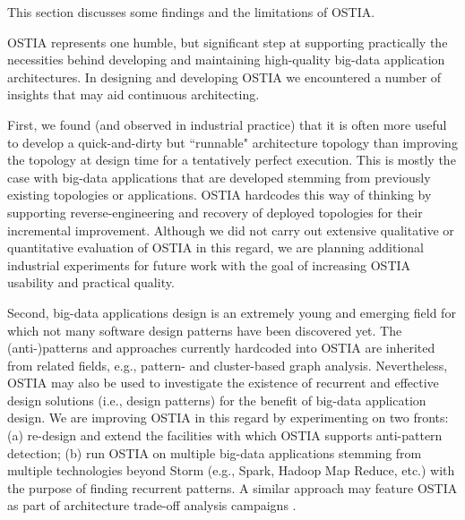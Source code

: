 This section discusses some findings and the limitations of OSTIA.

OSTIA represents one humble, but significant step at supporting practically the necessities behind developing and maintaining high-quality big-data application architectures. In designing and developing OSTIA we encountered a number of insights that may aid continuous architecting.

First, we found (and observed in industrial practice) that it is often more useful to develop a quick-and-dirty but ``runnable" architecture topology than improving the topology at design time for a tentatively perfect execution. This is mostly the case with big-data applications that are developed stemming from previously existing topologies or applications. OSTIA hardcodes this way of thinking by supporting reverse-engineering and recovery of deployed topologies for their incremental improvement. Although we did not carry out extensive qualitative or quantitative evaluation of OSTIA in this regard, we are planning additional industrial experiments for future work with the goal of increasing OSTIA usability and practical quality.

Second, big-data applications design is an extremely young and emerging field for which not many software design patterns have been discovered yet. The (anti-)patterns and approaches currently hardcoded into OSTIA are inherited from related fields, e.g., pattern- and cluster-based graph analysis. Nevertheless, OSTIA may also be used to investigate the existence of recurrent and effective design solutions (i.e., design patterns) for the benefit of big-data application design. We are improving OSTIA in this regard by experimenting on two fronts: (a) re-design and extend the facilities with which OSTIA supports anti-pattern detection; (b) run OSTIA on multiple big-data applications stemming from multiple technologies beyond Storm (e.g., Spark, Hadoop Map Reduce, etc.) with the purpose of finding recurrent patterns. A similar approach may feature OSTIA as part of architecture trade-off analysis campaigns \cite{atam}.


